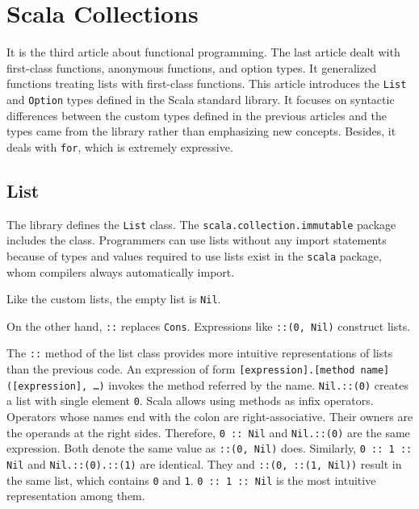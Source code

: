 \setchapterpreamble[u]{\margintoc}
\chapter{Scala Collections}

It is the third article about functional programming. The last article dealt with
first-class functions, anonymous functions, and option types. It generalized
functions treating lists with first-class functions. This article introduces the
\verb!List! and \verb!Option! types defined in the Scala standard library. It
focuses on syntactic differences between the custom types defined in the previous
articles and the types came from the library rather than emphasizing new
concepts. Besides, it deals with \verb!for!, which is extremely expressive.

\section{List}

The library defines the \verb!List! class. The \verb!scala.collection.immutable!
package includes the class. Programmers can use lists without any import
statements because  of types and values required to use lists exist
in the \verb!scala!
package, whom compilers
always automatically import.

Like the custom lists, the empty list is \verb!Nil!.

On the other hand, \verb!::! replaces \verb!Cons!. Expressions like
\verb!::(0, Nil)! construct lists.

The \verb!::! method of the list class provides more intuitive representations of
lists than the previous code. An expression of form \verb![expression].[method name]([expression], …)!
invokes the method referred by the name. \verb!Nil.::(0)!
creates a list with single element \verb!0!. Scala allows using methods as infix
operators. Operators whose names end with the colon are right-associative. Their
owners are the operands at the right sides. Therefore, \verb!0 :: Nil! and
\verb!Nil.::(0)! are the same expression. Both denote the same value as
\verb!::(0, Nil)! does. Similarly, \verb!0 :: 1 :: Nil! and
\verb!Nil.::(0).::(1)! are identical. They and \verb!::(0, ::(1, Nil))! result in
the same list, which contains \verb!0! and \verb!1!. \verb!0 :: 1 :: Nil! is the
most intuitive representation among them.

